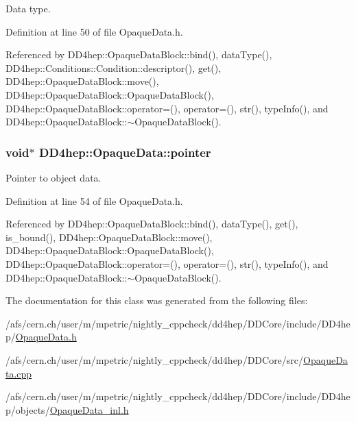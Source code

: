 Data type. 

Definition at line 50 of file OpaqueData.h.

Referenced by DD4hep::OpaqueDataBlock::bind(), dataType(), DD4hep::Conditions::Condition::descriptor(), get(), DD4hep::OpaqueDataBlock::move(), DD4hep::OpaqueDataBlock::OpaqueDataBlock(), DD4hep::OpaqueDataBlock::operator=(), operator=(), str(), typeInfo(), and DD4hep::OpaqueDataBlock::$\sim$OpaqueDataBlock().\hypertarget{class_d_d4hep_1_1_opaque_data_af7f449f3359f7f7a7190e6c9467d01fe}{
\subsubsection[{pointer}]{\setlength{\rightskip}{0pt plus 5cm}void$\ast$ {\bf DD4hep::OpaqueData::pointer}}}
\label{class_d_d4hep_1_1_opaque_data_af7f449f3359f7f7a7190e6c9467d01fe}


Pointer to object data. 

Definition at line 54 of file OpaqueData.h.

Referenced by DD4hep::OpaqueDataBlock::bind(), dataType(), get(), is\_\-bound(), DD4hep::OpaqueDataBlock::move(), DD4hep::OpaqueDataBlock::OpaqueDataBlock(), DD4hep::OpaqueDataBlock::operator=(), operator=(), str(), typeInfo(), and DD4hep::OpaqueDataBlock::$\sim$OpaqueDataBlock().

The documentation for this class was generated from the following files:\begin{DoxyCompactItemize}
\item 
/afs/cern.ch/user/m/mpetric/nightly\_\-cppcheck/dd4hep/DDCore/include/DD4hep/\hyperlink{_opaque_data_8h}{OpaqueData.h}\item 
/afs/cern.ch/user/m/mpetric/nightly\_\-cppcheck/dd4hep/DDCore/src/\hyperlink{_opaque_data_8cpp}{OpaqueData.cpp}\item 
/afs/cern.ch/user/m/mpetric/nightly\_\-cppcheck/dd4hep/DDCore/include/DD4hep/objects/\hyperlink{_opaque_data__inl_8h}{OpaqueData\_\-inl.h}\end{DoxyCompactItemize}

